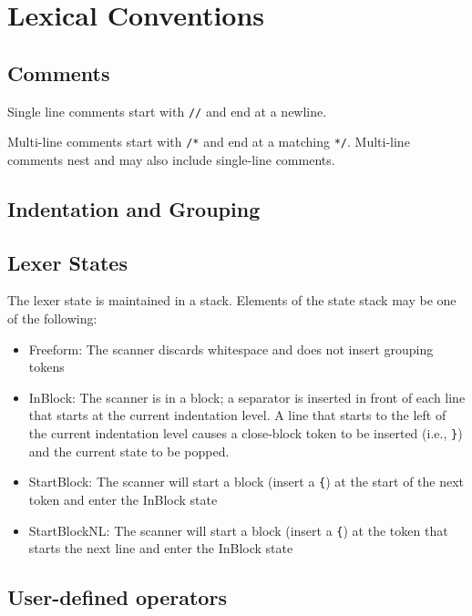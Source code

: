 \documentclass{article}
\begin{document}
\section{Lexical Conventions}

\subsection{Comments}

Single line comments start with \lstinline!//! and end at a newline.

Multi-line comments start with \lstinline!/*! and end at a matching
\lstinline!*/!.  Multi-line comments nest and may also include
single-line comments.

\subsection{Indentation and Grouping}

\subsection{Lexer States}

The lexer state is maintained in a stack. Elements of the state stack may be one
of the following:

\begin{itemize}

\item Freeform: The scanner discards whitespace and does not insert
  grouping tokens

\item InBlock: The scanner is in a block; a separator is inserted in
  front of each line that starts at the current indentation level.  A
  line that starts to the left of the current indentation level causes
  a close-block token to be inserted (i.e., \lstinline!}!) and the
    current state to be popped.

\item StartBlock: The scanner will start a block (insert a
  \lstinline!{!) at the start of the next token and enter the InBlock
    state

\item StartBlockNL: The scanner will start a block (insert a
  \lstinline!{!) at the token that starts the next line and enter the InBlock
    state

\end{itemize}

\subsection{User-defined operators}
\end{document}

